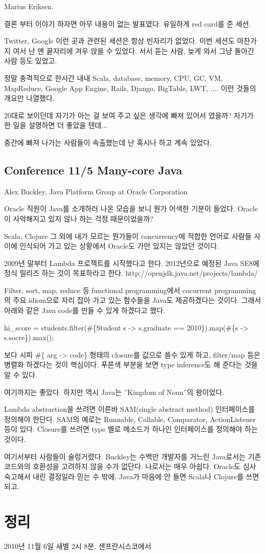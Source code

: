 \documentclass[a4paper]{article}
\begin{document}
Marius Eriksen. 
 
결론 부터 이야기 하자면 아무 내용이 없는 발표였다. 유일하게 red card를
준 세션.
 
Twitter, Google 이런 곳과 관련된 세션은 항상 빈자리가 없었다. 이번
세션도 마찬가지 여서 난 맨 끝자리에 겨우 앉을 수 있었다. 서서 듣는
사람, 늦게 와서 그냥 돌아간 사람 등도 있었고.
 
정말 충격적으로 한시간 내내 Scala, database, memory, CPU, GC, VM,
MapReduce, Google App Engine, Rails, Django, BigTable, LWT, .... 이런
것들의 개요만 나열했다.
 
20대로 보이던데 자기가 아는 걸 보여 주고 싶은 생각에 빠져 있어서
였을까? 자기가 한 일을 설명하면 더 좋았을 텐데...
 
중간에 빠져 나가는 사람들이 속출했는데 난 혹시나 하고 계속 있었다. 
 
\subsection{Conference 11/5 Many-core Java}
 
Alex Buckley, Java Platform Group at Oracle Corporation
 
Oracle 직원이 Java를 소개하러 나온 모습을 보니 뭔가 어색한 기분이
들었다. Oracle이 사악해지고 있지 않나 하는 걱정 때문이었을까?
 
Scala, Clojure 그 외에 내가 모르는 뭔가들이 concurrency에 적합한 언어로
사람들 사이에 인식되어 가고 있는 상황에서 Oracle도 가만 있지는 않았던
것이다.
 
2009년 말부터 Lambda 프로젝트를 시작했다고 한다. 2012년으로 예정된
Java SE8에 정식 릴리즈 하는 것이 목표하라고 한다.
http://openjdk.java.net/projects/lambda/
 
Filter, sort, map, reduce 등 functional programming에서 cocurrent
programming의 주요 idiom으로 자리 잡아 가고 있는 함수들을 Java도
제공하겠다는 것이다. 그래서 아래와 같은 Java code를 만들 수 있게
하겠다고 했다.
 
hi\_score = students.filter(\#\{Student s -> s.graduate == 2010\}).map(\#\{s -> s.socre\}).max();
 
보다 시피 \#\{ arg -> code\} 형태의 closure를 값으로 쓸수 있게 하고,
filter/map 등은 병렬화 하겠다는 것이 핵심이다. 푸른색 부분을 보면 type
inference도 해 준다는 것을 알 수 있다.
 
여기까지는 좋았다. 하지만 역시 Java는 ”Kingdom of Noun”의 왕이었다.
 
Lambda abstraction을 쓰려면 이른바 SAM(single abstract method)
인터페이스를 정의해야 한단다.  SAM의 예로는 Runnable, Callable,
Comparator, ActionListener 등이 있다. Closure를 쓰려면 type 별로
메소드가 하나인 인터페이스를 정의해야 하는 것이다.
 
여기서부터 사람들이 술렁거렸다. Buckley는 수백만 개발자를 거느린
Java로서는 기존 코드와의 호환성을 고려하지 않을 수가 없단다. 나로서는
매우 아쉽다. Oracle도 심사 숙고해서 내린 결정일라 믿는 수 밖에. Java가
마음에 안 들면 Scala나 Clojure를 쓰면 되고.

\section{정리}

2010년 11월 6일 새별 2시 8분.
샌프란시스코에서
\end{document}
